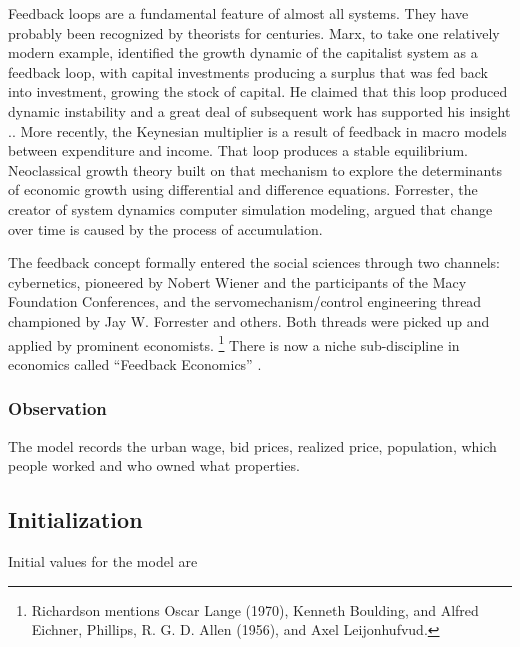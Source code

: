 {{Feedback loops are a fundamental feature of almost all systems. They have probably been recognized by theorists for centuries. Marx, to take one relatively modern example, identified the growth dynamic of the capitalist system  as a feedback loop, with capital investments producing a surplus that was fed back into investment, growing the stock of capital. He  claimed that this loop produced dynamic instability and a great deal of subsequent work has supported his insight \cite{dumenilStabilityInstabilityDynamic1986}.\cite{schumpeterInstabilityCapitalism1928}. More recently, the Keynesian multiplier is a result of feedback in macro models between expenditure and income. That loop produces a stable equilibrium. Neoclassical growth theory built on that mechanism to explore the determinants of economic growth using differential and difference equations. Forrester, the creator of system dynamics computer simulation modeling, argued that change over time is caused by the process of accumulation.

The feedback concept formally entered the social sciences through two channels: cybernetics, pioneered by Nobert Wiener  and the participants of the Macy Foundation Conferences, and the servomechanism/control engineering thread championed by Jay W. Forrester and others. Both threads were picked up and applied by prominent economists. \footnote{Richardson \cite{richardsonFeedbackThoughtSocial1991} mentions Oscar Lange (1970), Kenneth Boulding, and Alfred Eichner, Phillips,  R. G. D. Allen (1956), and Axel Leijonhufvud.} There is now a niche sub-discipline in economics called ``Feedback Economics'' \cite{radzickiIntroductionFeedbackEconomics, cavanaFeedbackEconomicsEconomic2021}. %



\subsubsection{Observation}
The model records the urban wage, bid prices, realized price, population, which people worked and who owned what properties.

\subsection{Initialization}
Initial values for the model are

}}
